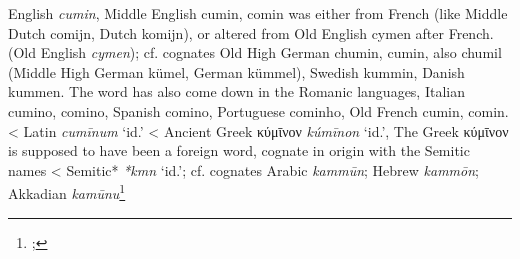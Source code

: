 \begin{etymology}\label{ety:cumin}
English \textit{cumin}, Middle English cumin, comin was either from French (like Middle Dutch comijn, Dutch komijn), or altered from Old English cymen after French. (Old English \textit{cymen}); cf. cognates Old High German chumin, cumin, also chumil (Middle High German kümel, German kümmel), Swedish kummin, Danish kummen. The word has also come down in the Romanic languages, Italian cumino, comino, Spanish comino, Portuguese cominho, Old French cumin, comin. 
< Latin \textit{cumīnum} `id.'
< Ancient Greek {κύμῑνον} \textit{kúmīnon} `id.', The Greek κύμῑνον is supposed to have been a foreign word, cognate in origin with the Semitic names
< Semitic* \textit{*kmn} `id.'; cf. cognates Arabic \textit{kammūn}; Hebrew \textit{kammōn}; Akkadian \textit{kamūnu}\footnote{\textcite[s.v. cumin]{oed}; }
\end{etymology}